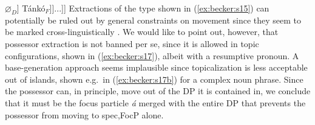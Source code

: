 \documentclass[output=paper,
modfonts
]{langscibook}
\begin{document}
\ea \relax[$_{FocP}$ \tikzmark{f2}\hspace{2mm}\tikzmark{f} [$_{Foc}$ c\'i] [$_{TP}$ ... [$_{F\tikzmark{t}P}$ \'a [$_{DP}$ [$_{D'}$ [$_{NP}$ nd\'ur] $\varnothing_D$] Tánkó$_F$]]...]]
     \label{ex:becker:s16}
\z
\vspace{6mm}
Extractions of the type shown in (\ref{ex:becker:s15}) can potentially be ruled out by general constraints on movement since they seem to be marked cross-linguistically \citep{Corver1990,Zeljko2005}. We would like to point out, however, that possessor extraction is not banned per se, since it is allowed in topic configurations, shown in (\ref{ex:becker:s17}), albeit with a resumptive pronoun. A base-generation approach seems implausible since topicalization is less acceptable out of islands, shown e.g.\ in (\ref{ex:becker:s17b}) for a complex noun phrase.
\ea
{}
\z \z
Since the possessor can, in principle, move out of the DP it is contained in, we conclude that it must be the focus particle {\em \'a} merged with the entire DP that prevents the possessor from moving to spec,FocP alone.
\end{document}
